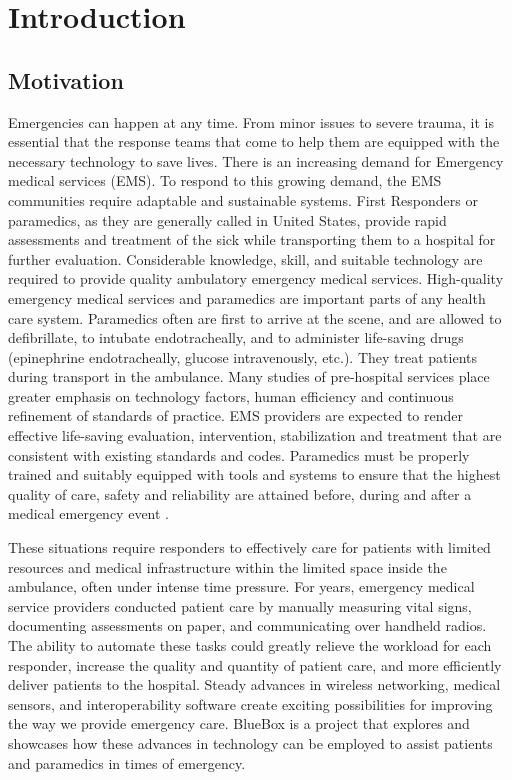 \chapter{Introduction}
\section{Motivation}

Emergencies can happen at any time. From minor issues to severe
trauma, it is essential that the response teams that come to help
them are equipped with the necessary technology to save lives. There
is an increasing demand for Emergency medical services (EMS). To
respond to this growing demand, the EMS communities require adaptable
and sustainable systems. First Responders or paramedics, as they are
generally called in United States, provide rapid assessments and
treatment of the sick while transporting them to a hospital for
further evaluation. Considerable knowledge, skill, and suitable
technology are required to provide quality ambulatory emergency
medical services. High-quality emergency medical services and
paramedics are important parts of any health care system. Paramedics
often are first to arrive at the scene, and are allowed to
defibrillate, to intubate endotracheally, and to administer
life-saving drugs (epinephrine endotracheally, glucose intravenously,
etc.). They treat patients during transport in the ambulance. Many
studies of pre-hospital services place greater emphasis on technology
factors, human efficiency and continuous refinement of standards of
practice. EMS providers are expected to render effective life-saving
evaluation, intervention, stabilization and treatment that are
consistent with existing standards and codes. Paramedics must be
properly trained and suitably equipped with tools and systems to
ensure that the highest quality of care, safety and reliability are
attained before, during and after a medical emergency event
\cite{EMS, EMS1, EMS2, EMS3}.

These situations require responders to effectively care for patients
with limited resources and medical infrastructure within the limited
space inside the ambulance, often under intense time pressure. For
years, emergency medical service providers conducted patient care by
manually measuring vital signs, documenting assessments on paper, and
communicating over handheld radios. The ability to automate these
tasks could greatly relieve the workload for each responder, increase
the quality and quantity of patient care, and more efficiently
deliver patients to the hospital.  Steady advances in wireless
networking, medical sensors, and interoperability software create
exciting possibilities for improving the way we provide emergency
care. BlueBox is a project that explores and showcases how these
advances in technology can be employed to assist patients and
paramedics in times of emergency. 

